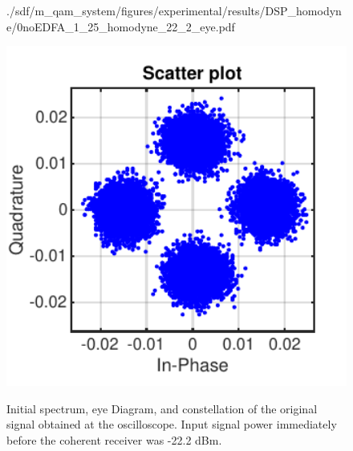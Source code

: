 \begin{figure}[H]
\begin{minipage}{0.3\textwidth}
			{./sdf/m_qam_system/figures/experimental/results/DSP_homodyne/0noEDFA_1_25_homodyne_22_2_eye.pdf}
			\label{fig:1250MBdSpecBefFecHm}
		\end{minipage}
		\begin{minipage}{0.3\textwidth}
			\centering
			\includegraphics[width=1\textwidth]
			{./sdf/m_qam_system/figures/experimental/results/DSP_homodyne/0noEDFA_1_25_homodyne_22_2_const.pdf}\\
			\label{fig:1250MBdSpecBefFecCHm}
		\end{minipage}
		\caption{Initial spectrum, eye Diagram, and constellation of the original
			signal obtained at the oscilloscope. Input signal power immediately before the
		coherent receiver was -22.2 dBm.}
		\label{fig:1250MBdinitHmi}
	\end{figure}


